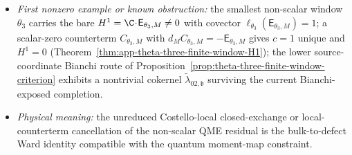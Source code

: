 \documentclass[11pt]{memoir}
\begin{document}
\begin{prob}
\begin{itemize}
      is the criterion in that tower.
    \item \emph{First nonzero example or known obstruction:} the
      smallest non-scalar window \(\theta_3\) carries the bare
      \(H^1=\C\!\cdot\!\mathsf E_{\theta_3,M}\ne0\) with covector
	      \(\ell_{\theta_3}(\mathsf E_{\theta_3,M})=1\); a
      scalar-zero counterterm \(C_{\theta_3,M}\) with
      \(d_MC_{\theta_3,M}=-\mathsf E_{\theta_3,M}\) gives \(c=1\)
      unique and \(H^1=0\)
      (Theorem~\ref{thm:app-theta-three-finite-window-H1}); the
      lower source-coordinate Bianchi route of
      Proposition~\ref{prop:theta-three-finite-window-criterion}
      exhibits a nontrivial cokernel
      \(\widetilde\lambda_{02,\mathfrak b}\) surviving the current
      Bianchi-exposed completion.
    \item \emph{Physical meaning:} the unreduced
      Costello-local closed-exchange or local-counterterm cancellation
      of the non-scalar QME residual is the bulk-to-defect Ward identity
      compatible with the quantum moment-map constraint.
  \end{itemize}


\end{prob}
\end{document}
